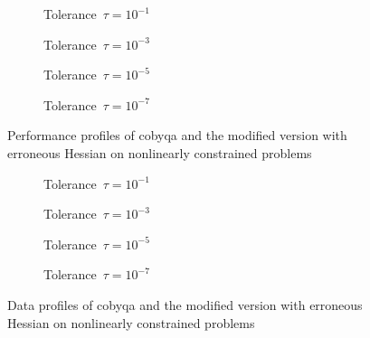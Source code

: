 \begin{figure}[ht]
    \centering
    \begin{subfigure}[b]{0.49\textwidth}
        \centering
        \caption{Tolerance~$\tau = 10^{-1}$}
    \end{subfigure}
    \hfill
    \begin{subfigure}[b]{0.49\textwidth}
        \centering
        \caption{Tolerance~$\tau = 10^{-3}$}
    \end{subfigure}
    \begin{subfigure}[b]{0.49\textwidth}
        \centering
        \caption{Tolerance~$\tau = 10^{-5}$}
    \end{subfigure}
    \hfill
    \begin{subfigure}[b]{0.49\textwidth}
        \centering
        \caption{Tolerance~$\tau = 10^{-7}$}
    \end{subfigure}
    \caption[Performance profiles with erroneous Hessian]{Performance profiles of \gls{cobyqa} and the modified version with erroneous Hessian on nonlinearly constrained problems}
    \label{fig:perf-wrong-hessian}
\end{figure}

\begin{figure}[ht]
    \centering
    \begin{subfigure}[b]{0.49\textwidth}
        \centering
        \caption{Tolerance~$\tau = 10^{-1}$}
    \end{subfigure}
    \hfill
    \begin{subfigure}[b]{0.49\textwidth}
        \centering
        \caption{Tolerance~$\tau = 10^{-3}$}
    \end{subfigure}
    \begin{subfigure}[b]{0.49\textwidth}
        \centering
        \caption{Tolerance~$\tau = 10^{-5}$}
    \end{subfigure}
    \hfill
    \begin{subfigure}[b]{0.49\textwidth}
        \centering
        \caption{Tolerance~$\tau = 10^{-7}$}
    \end{subfigure}
    \caption[Data profiles with erroneous Hessian]{Data profiles of \gls{cobyqa} and the modified version with erroneous Hessian on nonlinearly constrained problems}
    \label{fig:data-wrong-hessian}
\end{figure}


